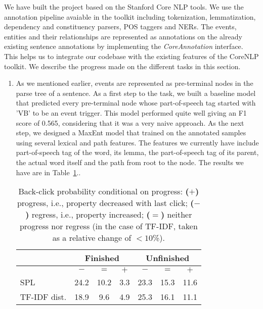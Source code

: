 We have built the project based on the Stanford Core NLP tools. We use the annotation pipeline avaiable in the toolkit including tokenization, lemmatization, dependency and constituency parsers, POS taggers and NERs. The events, entities and their relationships are represented as annotations on the already existing sentence annotations by implementing the {\em CoreAnnotation} interface. This helps us to integrate our codebase with the existing features of the CoreNLP toolkit. We describe the progress made on the different tasks in this section.

\begin{enumerate}

\item {} As we mentioned earlier, events are represented as pre-terminal nodes in the parse tree of a sentence. As a first step to the task, we built a baseline model that predicted every pre-terminal node whose part-of-speech tag started with 'VB' to be an event trigger. This model performed quite well giving an F1 score of 0.565, considering that it was a very naive approach. As the next step, we designed a MaxEnt model that trained on the annotated samples using several lexical and path features. The features we currently have include part-of-speech tag of the word, its lemma, the part-of-speech tag of its parent, the actual word itself and the path from root to the node. The results we have are in Table~\ref{table:backclickproperties}..

\begin{table}
\centering
\begin{tabular}{|l||c|c|c||c|c|c|} \hline
& \multicolumn{3}{|c||}{\textbf{Finished}} & \multicolumn{3}{|c|}{\textbf{Unfinished}}\\ \hline
&$-$&$=$&$+$&$-$&$=$&$+$ \\ \hline
\hline
SPL&24.2 & 10.2&3.3 &23.3 &15.3 &11.6\\
\hline
TF-IDF dist.&18.9&9.6&4.9&25.3&16.1&11.1\\
\hline
\end{tabular}
\caption{Back-click probability conditional on progress:
\textbf{($+$)} progress, i.e., property decreased with last click;
\textbf{($-$)} regress, i.e., property increased;
\textbf{($=$)} neither progress nor regress (in the case of TF-IDF, taken as a relative change of $<10$\%).
}
\label{table:backclickproperties}
\end{table}


\end{enumerate}
